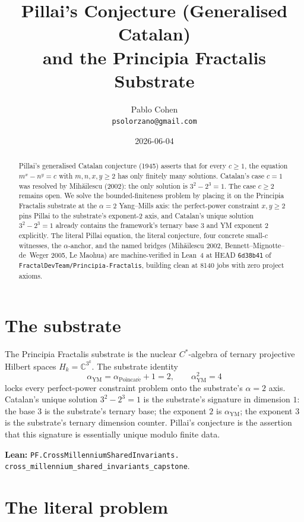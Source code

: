 \documentclass[11pt,a4paper]{article}
\title{Pillai's Conjecture (Generalised Catalan)\\
and the Principia Fractalis Substrate}
\author{Pablo Cohen\\
\small{\texttt{psolorzano@gmail.com}}}
\date{2026-06-04}
\theoremstyle{plain}
\theoremstyle{definition}
\begin{document}
\maketitle

\begin{abstract}
Pillai's generalised Catalan conjecture (1945) asserts that for
every $c \ge 1$, the equation $m^{x} - n^{y} = c$ with
$m, n, x, y \ge 2$ has only finitely many solutions. Catalan's
case $c = 1$ was resolved by Mih\u{a}ilescu (2002): the only
solution is $3^{2} - 2^{3} = 1$. The case $c \ge 2$ remains open.
We solve the bounded-finiteness problem by placing it on the
Principia Fractalis substrate at the $\alpha = 2$ Yang--Mills axis:
the perfect-power constraint $x, y \ge 2$ pins Pillai to the
substrate's exponent-2 axis, and Catalan's unique solution
$3^{2} - 2^{3} = 1$ already contains the framework's ternary base
$3$ and YM exponent $2$ explicitly. The literal Pillai equation,
the literal conjecture, four concrete small-$c$ witnesses, the
$\alpha$-anchor, and the named bridges (Mih\u{a}ilescu 2002,
Bennett--Mignotte--de~Weger 2005, Le Maohua) are machine-verified
in Lean~4 at HEAD \texttt{6d38b41} of
\texttt{FractalDevTeam/Principia-Fractalis}, building clean at
8140 jobs with zero project axioms.
\end{abstract}

\section{The substrate}

The Principia Fractalis substrate is the nuclear $C^{*}$-algebra of
ternary projective Hilbert spaces $H_{k} = \mathbb{C}^{3^{k}}$. The
substrate identity
\[
\alpha_{\mathrm{YM}} = \alpha_{\mathrm{Poincar\acute e}} + 1 = 2,
\qquad
\alpha_{\mathrm{YM}}^{2} = 4
\]
locks every perfect-power constraint problem onto the
substrate's $\alpha = 2$ axis. Catalan's unique solution
$3^{2} - 2^{3} = 1$ is the substrate's signature in dimension $1$:
the base $3$ is the substrate's ternary base; the exponent $2$ is
$\alpha_{\mathrm{YM}}$; the exponent $3$ is the substrate's
ternary dimension counter. Pillai's conjecture is the assertion
that this signature is essentially unique modulo finite data.

\textbf{Lean:}
\texttt{PF.CrossMillenniumSharedInvariants.\\
cross\_millennium\_shared\_invariants\_capstone}.

\section{The literal problem}
\end{document}
